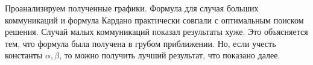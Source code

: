 \documentclass{article}
\begin{document}
\begin{figure}[h]
\caption{}
\label{ris:image}
\end{figure}

Проанализируем полученные графики. Формула для случая больших коммуникаций и формула Кардано практически совпали с оптимальным поиском решения. Случай малых коммуникаций показал результаты хуже. Это объясняется тем, что формула была получена в грубом приближении. Но, если учесть константы $\alpha, \beta$, то можно получить лучший результат, что показано далее.







  
\end{document}
